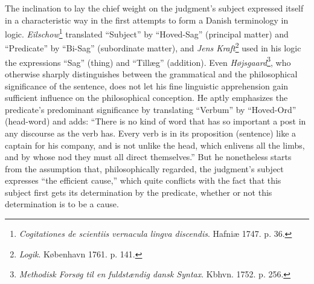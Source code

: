 \documentclass[12pt,a4paper]{book}
\newcommand{\opage}[1]{\marginnote{\footnotesize\textit{[#1]}}}
\begin{document}
The inclination to lay the chief weight on the judgment's subject
expressed itself in a characteristic way in the first attempts to form a
Danish terminology in logic. \emph{Eilschow}\footnote{\emph{Cogitationes
de scientiis vernacula lingva discendis}. Hafniæ 1747. p. 36.} translated
``Subject'' by ``Hoved-Sag'' (principal matter) and ``Predicate'' by
``Bi-Sag'' (subordinate matter), and \emph{Jens Kraft}\footnote{\emph{Logik}.
København 1761. p. 141.} used in his logic the expressions ``Sag'' (thing)
and ``Tillæg'' (addition). Even \emph{Højsgaard}\footnote{\emph{Methodisk
Forsøg til en fuldstændig dansk Syntax}. Kbhvn. 1752. p. 256.}, who
otherwise sharply distinguishes between the grammatical and the
philosophical significance of the sentence, does not let his fine
linguistic apprehension gain sufficient influence on the philosophical
\opage{97}conception. He aptly emphasizes the predicate's predominant significance
by translating ``Verbum'' by ``Hoved-Ord'' (head-word) and adds: ``There
is no kind of word that has so important a post in any discourse as the
verb has. Every verb is in its proposition (sentence) like a captain for
his company, and is not unlike the head, which enlivens all the limbs, and
by whose nod they must all direct themselves.'' But he nonetheless starts
from the assumption that, philosophically regarded, the judgment's subject
expresses ``the efficient cause,'' which quite conflicts with the fact that
this subject first gets its determination by the predicate, whether or not
this determination is to be a cause.
\end{document}
